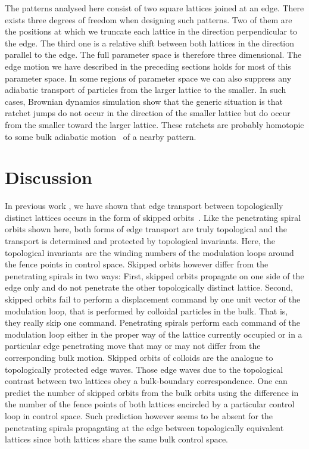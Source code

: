\documentclass[12pt]{iopart}
\begin{document}
The patterns analysed here consist of two square lattices joined at an edge. There exists three degrees of freedom when designing
such patterns. Two of them are the positions at which we truncate each lattice in the direction perpendicular to the edge. The third
one is a relative shift between both lattices in the direction parallel to the edge. The full parameter space is therefore three dimensional.
The edge motion we have described in the preceding sections holds for most of this parameter space. In some regions of parameter space we can 
also suppress any adiabatic transport of particles from the larger lattice to the smaller. 
In such cases, Brownian dynamics simulation show that the generic situation is that ratchet jumps do not occur in the direction of the smaller lattice but do occur from the smaller toward the larger lattice. 
These ratchets are probably homotopic to some bulk adiabatic motion~\cite{tp1} of a nearby pattern. 

\section{Discussion}

In previous work \cite{colloidalTI}, we have shown that edge transport between topologically distinct lattices occurs in the form
of skipped orbits~\cite{Beenakker,Davies,Montambaux,Shi,Zhirov,Mancini}. Like the penetrating spiral orbits shown here, both forms
of edge transport are truly topological and the transport is determined and protected by topological invariants. Here,
the topological invariants are the winding numbers of the modulation loops around the fence points in control space.
Skipped orbits however differ from the penetrating spirals in two ways: First, skipped orbits propagate on one side of the edge only
and do not penetrate the other topologically distinct lattice. Second, skipped orbits fail to perform a displacement
command by one unit vector of the modulation loop, that is performed by colloidal particles in the bulk. That is, they really skip one command.
Penetrating spirals perform each command of the modulation loop either in the proper way of the lattice currently occupied
or in a particular edge penetrating move that may or may not differ from the corresponding bulk motion.
Skipped orbits of colloids are the analogue to topologically protected edge waves. Those edge waves due
to the topological contrast between two lattices obey a bulk-boundary correspondence. One can predict the number of skipped orbits
from the bulk orbits using the difference in the number of the fence points of both lattices encircled by a particular control loop in control space.
Such prediction however seems to be absent for the penetrating spirals propagating at the edge between topologically equivalent lattices since
both lattices share the same bulk control space.
\end{document}
